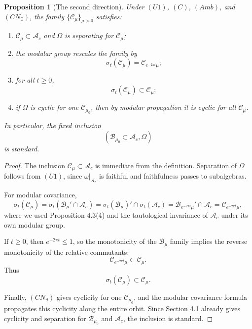 \documentclass[12pt]{article}
\newtheorem{proposition}[theorem]{Proposition}
\theoremstyle{definition}
\theoremstyle{remark}
\newcommand{\tightlist}{%
  \setlength{\itemsep}{0pt}\setlength{\parskip}{0pt}}
\begin{document}
\begin{proposition}[The second direction]\label{prop:4.6}
Under \((U1)\), \((C)\), \((Amb)\), and \((CN_\exists)\), the
family \(\{\mathcal{C}_\mu\}_{\mu>0}\) satisfies:

\begin{enumerate}
\def\labelenumi{\arabic{enumi}.}
\tightlist
\item
  \(\mathcal{C}_\mu\subset \mathcal{A}_c\) and \(\Omega\) is separating
  for \(\mathcal{C}_\mu\);
\item
  the modular group rescales the family by \[
  \sigma_t(\mathcal{C}_\mu)=\mathcal{C}_{e^{-2\pi t}\mu};
  \]
\item
  for all \(t\ge 0\), \[
  \sigma_t(\mathcal{C}_\mu)\subset \mathcal{C}_\mu;
  \]
\item
  if \(\Omega\) is cyclic for one \(\mathcal{C}_{\mu_0}\), then by
  modular propagation it is cyclic for all \(\mathcal{C}_\mu\).
\end{enumerate}

In particular, the fixed inclusion \[
(\mathcal{B}_{\mu_0}\subset \mathcal{A}_c,\Omega)
\] is standard.
\end{proposition}

\begin{proof}
The inclusion \(\mathcal{C}_\mu\subset \mathcal{A}_c\) is immediate from
the definition. Separation of \(\Omega\) follows from \((U1)\), since
\(\omega|_{\mathcal{A}_c}\) is faithful and faithfulness passes to
subalgebras.

For modular covariance, \[
\sigma_t(\mathcal{C}_\mu)
=
\sigma_t(\mathcal{B}_\mu'\cap \mathcal{A}_c)
=
\sigma_t(\mathcal{B}_\mu)'\cap \sigma_t(\mathcal{A}_c)
=
\mathcal{B}_{e^{-2\pi t}\mu}'\cap \mathcal{A}_c
=
\mathcal{C}_{e^{-2\pi t}\mu},
\] where we used Proposition 4.3(4) and the tautological invariance of
\(\mathcal{A}_c\) under its own modular group.

If \(t\ge 0\), then \(e^{-2\pi t}\le 1\), so the monotonicity of the
\(\mathcal{B}_\mu\) family implies the reverse monotonicity of the
relative commutants: \[
\mathcal{C}_{e^{-2\pi t}\mu}\subset \mathcal{C}_\mu.
\] Thus \[
\sigma_t(\mathcal{C}_\mu)\subset \mathcal{C}_\mu.
\]

Finally, \((CN_\exists)\) gives cyclicity for one
\(\mathcal{C}_{\mu_0}\), and the modular covariance formula propagates
this cyclicity along the entire orbit. Since Section 4.1 already gives
cyclicity and separation for \(\mathcal{B}_{\mu_0}\) and
\(\mathcal{A}_c\), the inclusion is standard.
\end{proof}
\end{document}
